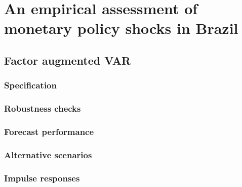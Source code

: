 \chapter{An empirical assessment of monetary policy shocks in Brazil}
    \lipsum[1]
    
    
    
    \section{Factor augmented VAR}
        \lipsum[1]
        \subsection{Specification}
            \lipsum[1]
        \subsection{Robustness checks}
            \lipsum[1]
        \subsection{Forecast performance}
            \lipsum[1]
        \subsection{Alternative scenarios}
            \lipsum[1]
        \subsection{Impulse responses}
            \lipsum[1]